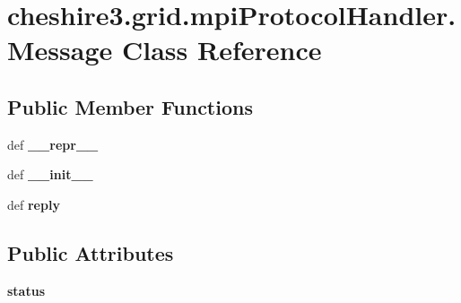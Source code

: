 \hypertarget{classcheshire3_1_1grid_1_1mpi_protocol_handler_1_1_message}{\section{cheshire3.\-grid.\-mpi\-Protocol\-Handler.\-Message Class Reference}
\label{classcheshire3_1_1grid_1_1mpi_protocol_handler_1_1_message}
}
\subsection*{Public Member Functions}
\begin{DoxyCompactItemize}
\item 
\hypertarget{classcheshire3_1_1grid_1_1mpi_protocol_handler_1_1_message_ab2700fb1beee6d6830891aafc705f852}{def {\bfseries \-\_\-\-\_\-repr\-\_\-\-\_\-}}\label{classcheshire3_1_1grid_1_1mpi_protocol_handler_1_1_message_ab2700fb1beee6d6830891aafc705f852}

\item 
\hypertarget{classcheshire3_1_1grid_1_1mpi_protocol_handler_1_1_message_ac80e5ca7230d873907048b40c7beae17}{def {\bfseries \-\_\-\-\_\-init\-\_\-\-\_\-}}\label{classcheshire3_1_1grid_1_1mpi_protocol_handler_1_1_message_ac80e5ca7230d873907048b40c7beae17}

\item 
\hypertarget{classcheshire3_1_1grid_1_1mpi_protocol_handler_1_1_message_a4c69d6b8cd3bf4d0ce2df3a6ae84d00e}{def {\bfseries reply}}\label{classcheshire3_1_1grid_1_1mpi_protocol_handler_1_1_message_a4c69d6b8cd3bf4d0ce2df3a6ae84d00e}

\end{DoxyCompactItemize}
\subsection*{Public Attributes}
\begin{DoxyCompactItemize}
\item 
\hypertarget{classcheshire3_1_1grid_1_1mpi_protocol_handler_1_1_message_ac5a23909a6683e88833ae2b1d3f6c67b}{{\bfseries status}}\label{classcheshire3_1_1grid_1_1mpi_protocol_handler_1_1_message_ac5a23909a6683e88833ae2b1d3f6c67b}

\end{DoxyCompactItemize}
